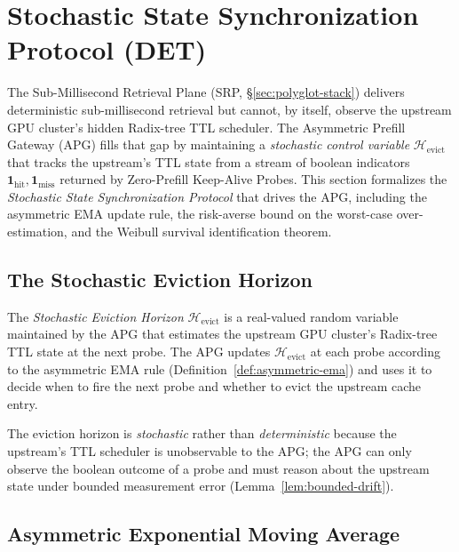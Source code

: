 \setcounter{section}{7}
\section{Stochastic State Synchronization Protocol (DET)}
\label{sec:det-protocol}

The Sub-Millisecond Retrieval Plane (SRP, \S\ref{sec:polyglot-stack})
delivers deterministic sub-millisecond retrieval but cannot, by itself,
observe the upstream GPU cluster's hidden Radix-tree TTL scheduler.
The Asymmetric Prefill Gateway (APG) fills that gap by maintaining a
\emph{stochastic control variable} $\mathcal{H}_{\text{evict}}$ that
tracks the upstream's TTL state from a stream of boolean indicators
$\mathbf{1}_{\text{hit}}, \mathbf{1}_{\text{miss}}$ returned by
Zero-Prefill Keep-Alive Probes. This section formalizes the
\emph{Stochastic State Synchronization Protocol} that drives the APG,
including the asymmetric EMA update rule, the risk-averse bound on
the worst-case over-estimation, and the Weibull survival
identification theorem.

\subsection{The Stochastic Eviction Horizon}

\begin{definition}
\label{def:evict-horizon}
The \emph{Stochastic Eviction Horizon} $\mathcal{H}_{\text{evict}}$ is
a real-valued random variable maintained by the APG that estimates the
upstream GPU cluster's Radix-tree TTL state at the next probe. The
APG updates $\mathcal{H}_{\text{evict}}$ at each probe according to
the asymmetric EMA rule (Definition~\ref{def:asymmetric-ema}) and uses
it to decide when to fire the next probe and whether to evict the
upstream cache entry.
\end{definition}

The eviction horizon is \emph{stochastic} rather than \emph{deterministic}
because the upstream's TTL scheduler is unobservable to the APG; the
APG can only observe the boolean outcome of a probe and must reason
about the upstream state under bounded measurement error
(Lemma~\ref{lem:bounded-drift}).

\subsection{Asymmetric Exponential Moving Average}

